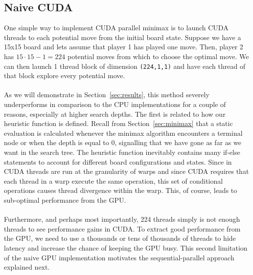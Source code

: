 \subsection{Naive CUDA}

One simple way to implement CUDA parallel minimax is to launch CUDA threads to each potential move from the initial board state. Suppose we have a 15x15 board and lets assume that player 1 has played one move. Then, player 2 has $15\cdot 15-1=224$ potential moves from which to choose the optimal move. We can then launch 1 thread block of dimension \texttt{(224,1,1)} and have each thread of that block explore every potential move. \\
\\
As we will demonstrate in Section~\ref{sec:results}, this method severely underperforms in comparison to the CPU implementations for a couple of reasons, especially at higher search depths. The first is related to how our heuristic function is defined. Recall from Section~\ref{sec:minimax} that a static evaluation is calculated whenever the minimax algorithm encounters a terminal node or when the depth is equal to 0, signalling that we have gone as far as we want in the search tree. The heuristic function inevitably contains many if-else statements to account for different board configurations and states. Since in CUDA threads are run at the granularity of warps and since CUDA requires that each thread in a warp execute the same operation, this set of conditional operations causes thread divergence within the warp. This, of course, leads to sub-optimal performance from the GPU. \\
\\
Furthermore, and perhaps most importantly, 224 threads simply is not enough threads to see performance gains in CUDA. To extract good performance from the GPU, we need to use a thousands or tens of thousands of threads to hide latency and increase the chance of keeping the GPU busy. This second limitation of the naive GPU implementation motivates the sequential-parallel approach explained next.

